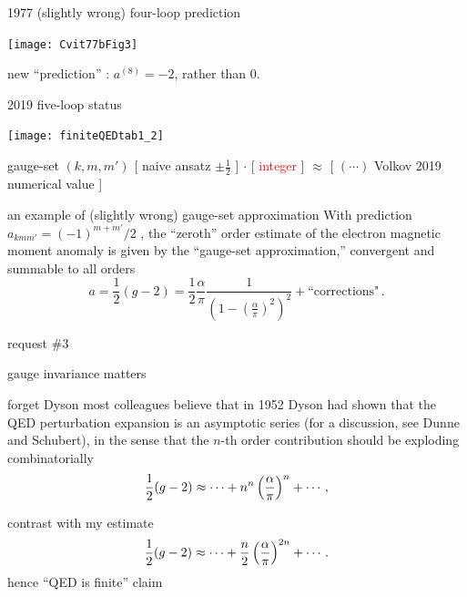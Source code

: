 \begin{frame}{1977 (slightly wrong) four-loop prediction}
\begin{center}
\texttt{[image: Cvit77bFig3]}
\end{center}

{\scriptsize  %
new ``prediction'' : $a^{(8)}=-2$, rather than 0.
}
\end{frame}

\begin{frame}{2019 five-loop status}
\begin{center}
\texttt{[image: finiteQEDtab1\_2]}
\end{center}


\begin{block} {gauge-set $(k,m,m')$}
{\scriptsize
[ naive ansatz $\pm\frac{1}{2}$ ] $\cdot$
[ \textcolor{red}{integer} ] $\approx$ %
[ $(\cdots)$ Volkov 2019 numerical value ]
            } %
\end{block}
\end{frame}


\begin{frame}{an example of (slightly wrong) gauge-set approximation}
With prediction \(
a_{kmm'} = (-1)^{m+m'}\!/2
\) %
, the ``zeroth'' order estimate of the electron
magnetic moment anomaly is given by the ``gauge-set
approximation,'' convergent and summable to all orders
\[ %
a=\frac{1}{2}(g-2) =  \frac{1}{2} \frac{\alpha}{\pi}
                     \frac{1}
           {\left( 1 - \left(\frac{\alpha}{\pi}\right)^2
			\right)^2
		      } + \mbox{``corrections"}
\,.
\] %
\end{frame}

\begin{frame}{request \#3}
\begin{center}
{\huge gauge invariance matters}
\end{center}
\end{frame}


\begin{frame}{forget Dyson}
most
colleagues believe that in 1952 Dyson had  shown that the
QED perturbation expansion is an asymptotic series (for a discussion, see
Dunne and Schubert), in the sense that the $n$-th order
contribution should be exploding combinatorially
$$
{1 \over 2} (g-2) \approx
\cdots + n^n \left(\frac{\alpha}{\pi}\right)^n + \cdots
\,,
$$

contrast with my estimate
\[
{1 \over 2} (g-2) \approx
\cdots + \frac{n}{2}\left(\frac{\alpha}{\pi}\right)^{2n} + \cdots
\,.
\]
hence ``QED is finite'' claim
\end{frame}

